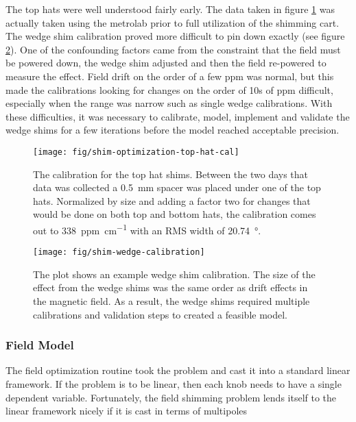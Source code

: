 The top hats were well understood fairly early.  The data taken in figure \ref{fig:shim-optimization-top-hat-cal} was actually taken using the metrolab prior to full utilization of the shimming cart.  The wedge shim calibration proved more difficult to pin down exactly (see figure \ref{fig:shim-wedge-calibration}).  One of the confounding factors came from the constraint that the field must be powered down, the wedge shim adjusted and then the field re-powered to measure the effect.  Field drift on the order of a few ppm was normal, but this made the calibrations looking for changes on the order of 10s of ppm difficult, especially when the range was narrow such as single wedge calibrations.  With these difficulties, it was necessary to calibrate, model, implement and validate the wedge shims for a few iterations before the model reached acceptable precision.

\begin{figure}
\centering
\texttt{[image: fig/shim-optimization-top-hat-cal]}
\caption{
    The calibration for the top hat shims.  Between the two days that data was collected a \SI{0.5}{\milli\meter} spacer was placed under one of the top hats.  Normalized by size and adding a factor two for changes that would be done on both top and bottom hats, the calibration comes out to \SI{338}{ppm\per\centi\meter} with an RMS width of \SI{20.74}{\degree}. 
    \label{fig:shim-optimization-top-hat-cal}
}
\end{figure}

\begin{figure}
\centering
\texttt{[image: fig/shim-wedge-calibration]}
\caption{
    The plot shows an example wedge shim calibration.  The size of the effect from the wedge shims was the same order as drift effects in the magnetic field.  As a result, the wedge shims required multiple calibrations and validation steps to created a feasible model.
    \label{fig:shim-wedge-calibration}
}
\end{figure}

\subsubsection{Field Model}

The field optimization routine took the problem and cast it into a standard linear framework.  If the problem is to be linear, then each knob needs to have a single dependent variable.  Fortunately, the field shimming problem lends itself to the linear framework nicely if it is cast in terms of multipoles

